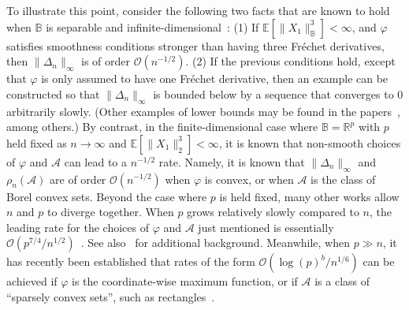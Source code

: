 \documentclass[aos,preprint]{imsart}
\numberwithin{equation}{section}
\theoremstyle{plain}
\newcommand{\R}{\mathbb{R}}
\newcommand{\E}{\mathbb{E}}
\newcommand{\1}{{\bf{1}}}
\newcommand{\0}{\mathbf{0}}
\begin{document}
   To illustrate this point, consider the following two facts that are known to hold when $\mathbb{B}$ is separable and infinite-dimensional~\citep{Bentkus:1993}: (1) If $\E[\|X_1\|_{\mathbb{B}}^3]<\infty$, and $\varphi$ satisfies smoothness conditions stronger than having three Fr\'echet derivatives,  then $\|\Delta_n\|_{\infty}$ is of order $\mathcal{O}(n^{-1/2})$. (2) If the previous conditions hold, except that $\varphi$ is only assumed to have one Fr\'echet derivative, then an example can be constructed so that $\|\Delta_n\|_{\infty}$ is bounded below by a sequence that converges to 0 arbitrarily slowly.  (Other examples of lower bounds may be found in the papers~\citep{Bentkus:1986,Talagrand:1984}, among others.) By contrast, in the finite-dimensional case where $\mathbb{B}=\R^p$ with $p$ held fixed as $n\to\infty$ and $\E[\|X_1\|_2^3]<\infty$, it is known that  non-smooth choices of $\varphi$ and $\mathscr{A}$ can lead to a $n^{-1/2}$ rate. Namely, it is known that $\|\Delta_n\|_{\infty}$ and $\rho_n(\mathscr{A})$ are of order $\mathcal{O}(n^{-1/2})$ when $\varphi$ is convex, or when $\mathscr{A}$ is the class of Borel convex sets. Beyond the case where $p$ is held fixed, many other works allow $n$ and $p$ to diverge together. When $p$ grows relatively slowly compared to $n$, the leading rate for the choices of $\varphi$ and $\mathscr{A}$ just mentioned is essentially $\mathcal{O}(p^{7/4}/n^{1/2})$~\citep{Bentkus:2003,Bentkus:2005}. See also~\citep{Sazonov:1968,Nagaev:1976,Senatov:1981,Portnoy:1986,Gotze:1991,Chen:2011,Zhai:2018} for additional background. Meanwhile, when $p\gg n$, it has recently been established that rates of the form $\mathcal{O}(\log(p)^b/n^{1/6})$ can be achieved if $\varphi$ is the coordinate-wise maximum function, or if $\mathscr{A}$ is a class of ``sparsely convex sets'', such as rectangles~\citep{CCK:AOP}.
\end{document}

